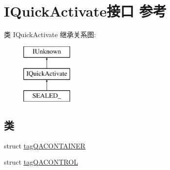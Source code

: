 \hypertarget{interface_i_quick_activate}{}\section{I\+Quick\+Activate接口 参考}
\label{interface_i_quick_activate}
类 I\+Quick\+Activate 继承关系图\+:\begin{figure}[H]
\begin{center}
\leavevmode
\includegraphics[height=3.000000cm]{interface_i_quick_activate}
\end{center}
\end{figure}
\subsection*{类}
\begin{DoxyCompactItemize}
\item 
struct \hyperlink{struct_i_quick_activate_1_1tag_q_a_c_o_n_t_a_i_n_e_r}{tag\+Q\+A\+C\+O\+N\+T\+A\+I\+N\+ER}
\item 
struct \hyperlink{struct_i_quick_activate_1_1tag_q_a_c_o_n_t_r_o_l}{tag\+Q\+A\+C\+O\+N\+T\+R\+OL}
\end{DoxyCompactItemize}
